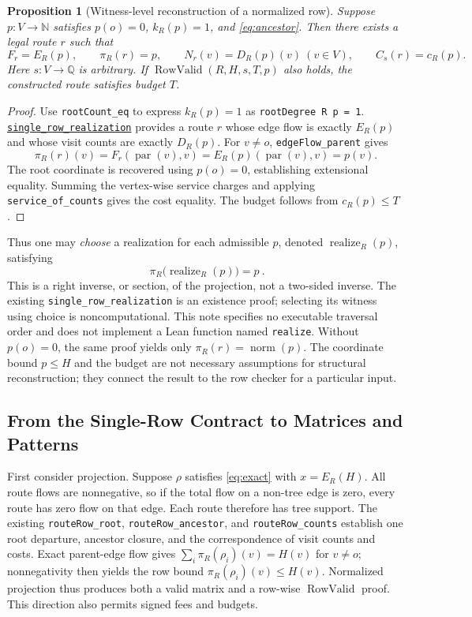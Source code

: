 \documentclass[11pt]{article}
\newtheorem{proposition}{Proposition}[section]
\theoremstyle{remark}
\newcommand{\N}{\mathbb N}
\newcommand{\Q}{\mathbb Q}
\newcommand{\pa}{\operatorname{par}}
\newcommand{\norm}{\operatorname{norm}}
\newcommand{\RV}{\operatorname{RowValid}}
\newcommand{\code}[1]{\nolinkurl{#1}}
\newcommand{\src}[2]{\href{https://github.com/huam54925-cpu/uav-routing-certification/blob/1bc992475a9bd515d77245e2bc0471e5ecab2fd5/LeanCompletion/UAV/#1.lean}{#2}}
\begin{document}
\begin{proposition}[Witness-level reconstruction of a normalized row]\label{prop:section}
Suppose $p:V\to\N$ satisfies $p(o)=0$, $k_R(p)=1$, and \eqref{eq:ancestor}.
Then there exists a legal route $r$ such that
\begin{equation}\label{eq:section}
 F_r=E_R(p),\qquad \pi_R(r)=p,\qquad
 N_r(v)=D_R(p)(v)\ (v\in V),\qquad C_s(r)=c_R(p).
\end{equation}
Here $s:V\to\Q$ is arbitrary. If $\RV(R,H,s,T,p)$ also holds, the constructed route satisfies budget $T$.
\end{proposition}
\begin{proof}
Use \code{rootCount_eq} to express $k_R(p)=1$ as \code{rootDegree R p = 1}.
\src{TreeBudgetRow}{\code{single_row_realization}}
provides a route $r$ whose edge flow is exactly $E_R(p)$ and whose visit counts are exactly $D_R(p)$.
For $v\neq o$, \code{edgeFlow_parent} gives
\[
 \pi_R(r)(v)=F_r(\pa(v),v)=E_R(p)(\pa(v),v)=p(v).
\]
The root coordinate is recovered using $p(o)=0$, establishing extensional equality.
Summing the vertex-wise service charges and applying \code{service_of_counts} gives the cost equality.
The budget follows from $c_R(p)\leq T$.
\end{proof}

Thus one may \emph{choose} a realization for each admissible $p$, denoted
$\operatorname{realize}_R(p)$, satisfying
\[
 \boxed{\ \pi_R\bigl(\operatorname{realize}_R(p)\bigr)=p\ }.
\]
This is a right inverse, or section, of the projection, not a two-sided inverse.
The existing \code{single_row_realization} is an existence proof;
selecting its witness using choice is noncomputational. This note specifies no executable traversal order and does not implement a Lean function named
\code{realize}.
Without $p(o)=0$, the same proof yields only $\pi_R(r)=\norm(p)$.
The coordinate bound $p\leq H$ and the budget are not necessary assumptions for structural reconstruction; they connect the result to the row checker for a particular input.

\subsection{From the Single-Row Contract to Matrices and Patterns}
First consider projection. Suppose $\rho$ satisfies \eqref{eq:exact} with $x=E_R(H)$.
All route flows are nonnegative, so if the total flow on a non-tree edge is zero, every route has zero flow on that edge.
Each route therefore has tree support. The existing \code{routeRow_root}, \code{routeRow_ancestor},
and \code{routeRow_counts} establish one root departure, ancestor closure, and the correspondence of visit counts and costs.
Exact parent-edge flow gives $\sum_i\pi_R(\rho_i)(v)=H(v)$ for $v\neq o$;
nonnegativity then yields the row bound $\pi_R(\rho_i)(v)\leq H(v)$.
Normalized projection thus produces both a valid matrix and a row-wise $\RV$ proof. This direction also permits signed fees and budgets.
\end{document}
